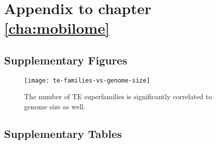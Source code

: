 \chapter{Appendix to chapter \ref{cha:mobilome}}

\section{Supplementary Figures}

\begin{figure}[h]
\centering
\texttt{[image: te-families-vs-genome-size]}
\caption[The number of TE superfamilies is significantly correlated to
genome size]{The number of TE superfamilies is significantly correlated to
genome size as well.}
\label{fig:te-families-vs-genome-size}
\end{figure}

\section{Supplementary Tables}

